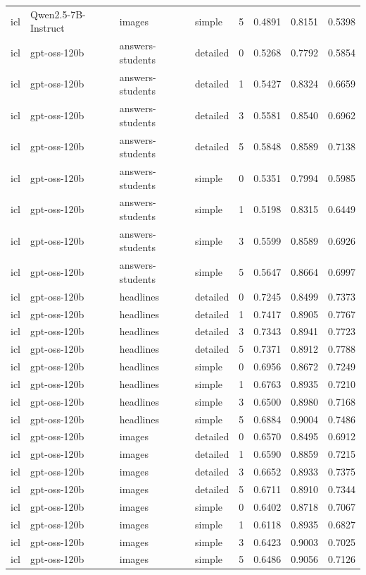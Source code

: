 \begin{longtable}{llllrrrr}
icl & Qwen2.5-7B-Instruct & images & simple & 5 & 0.4891 & 0.8151 & 0.5398 \\
icl & gpt-oss-120b & answers-students & detailed & 0 & 0.5268 & 0.7792 & 0.5854 \\
icl & gpt-oss-120b & answers-students & detailed & 1 & 0.5427 & 0.8324 & 0.6659 \\
icl & gpt-oss-120b & answers-students & detailed & 3 & 0.5581 & 0.8540 & 0.6962 \\
icl & gpt-oss-120b & answers-students & detailed & 5 & 0.5848 & 0.8589 & 0.7138 \\
icl & gpt-oss-120b & answers-students & simple & 0 & 0.5351 & 0.7994 & 0.5985 \\
icl & gpt-oss-120b & answers-students & simple & 1 & 0.5198 & 0.8315 & 0.6449 \\
icl & gpt-oss-120b & answers-students & simple & 3 & 0.5599 & 0.8589 & 0.6926 \\
icl & gpt-oss-120b & answers-students & simple & 5 & 0.5647 & 0.8664 & 0.6997 \\
icl & gpt-oss-120b & headlines & detailed & 0 & 0.7245 & 0.8499 & 0.7373 \\
icl & gpt-oss-120b & headlines & detailed & 1 & 0.7417 & 0.8905 & 0.7767 \\
icl & gpt-oss-120b & headlines & detailed & 3 & 0.7343 & 0.8941 & 0.7723 \\
icl & gpt-oss-120b & headlines & detailed & 5 & 0.7371 & 0.8912 & 0.7788 \\
icl & gpt-oss-120b & headlines & simple & 0 & 0.6956 & 0.8672 & 0.7249 \\
icl & gpt-oss-120b & headlines & simple & 1 & 0.6763 & 0.8935 & 0.7210 \\
icl & gpt-oss-120b & headlines & simple & 3 & 0.6500 & 0.8980 & 0.7168 \\
icl & gpt-oss-120b & headlines & simple & 5 & 0.6884 & 0.9004 & 0.7486 \\
icl & gpt-oss-120b & images & detailed & 0 & 0.6570 & 0.8495 & 0.6912 \\
icl & gpt-oss-120b & images & detailed & 1 & 0.6590 & 0.8859 & 0.7215 \\
icl & gpt-oss-120b & images & detailed & 3 & 0.6652 & 0.8933 & 0.7375 \\
icl & gpt-oss-120b & images & detailed & 5 & 0.6711 & 0.8910 & 0.7344 \\
icl & gpt-oss-120b & images & simple & 0 & 0.6402 & 0.8718 & 0.7067 \\
icl & gpt-oss-120b & images & simple & 1 & 0.6118 & 0.8935 & 0.6827 \\
icl & gpt-oss-120b & images & simple & 3 & 0.6423 & 0.9003 & 0.7025 \\
icl & gpt-oss-120b & images & simple & 5 & 0.6486 & 0.9056 & 0.7126 \\
\end{longtable}
